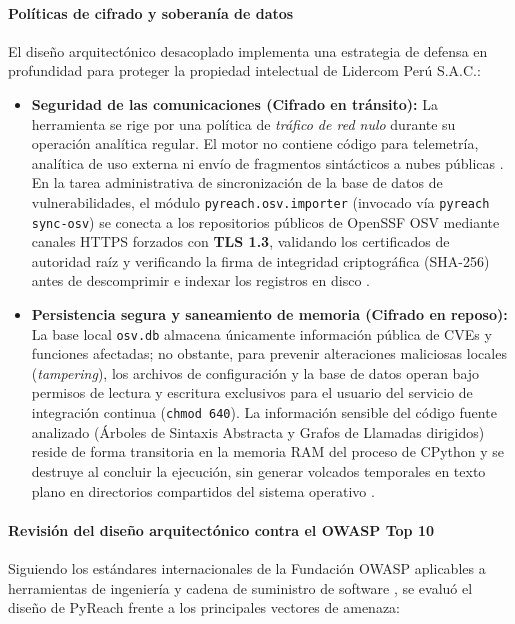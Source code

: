 \paragraph*{Políticas de cifrado y soberanía de datos}
El diseño arquitectónico desacoplado implementa una estrategia de defensa en profundidad para proteger la propiedad intelectual de Lidercom Perú S.A.C.:

\begin{itemize}
    \item \textbf{Seguridad de las comunicaciones (Cifrado en tránsito):} La herramienta se rige por una política de \textit{tráfico de red nulo} durante su operación analítica regular. El motor no contiene código para telemetría, analítica de uso externa ni envío de fragmentos sintácticos a nubes públicas \cite{ladisa2023sok}. En la tarea administrativa de sincronización de la base de datos de vulnerabilidades, el módulo \texttt{pyreach.\allowbreak osv.\allowbreak importer} (invocado vía \texttt{pyreach sync-\allowbreak osv}) se conecta a los repositorios públicos de OpenSSF OSV mediante canales HTTPS forzados con \textbf{TLS 1.3}, validando los certificados de autoridad raíz y verificando la firma de integridad criptográfica (SHA-256) antes de descomprimir e indexar los registros en disco \cite{openssf2023osv}.
    \item \textbf{Persistencia segura y saneamiento de memoria (Cifrado en reposo):} La base local \texttt{osv.\allowbreak db} almacena únicamente información pública de CVEs y funciones afectadas; no obstante, para prevenir alteraciones maliciosas locales (\textit{tampering}), los archivos de configuración y la base de datos operan bajo permisos de lectura y escritura exclusivos para el usuario del servicio de integración continua (\texttt{chmod 640}). La información sensible del código fuente analizado (Árboles de Sintaxis Abstracta y Grafos de Llamadas dirigidos) reside de forma transitoria en la memoria RAM del proceso de CPython y se destruye al concluir la ejecución, sin generar volcados temporales en texto plano en directorios compartidos del sistema operativo \cite{pressman2020software}.
\end{itemize}

\paragraph*{Revisión del diseño arquitectónico contra el OWASP Top 10}
Siguiendo los estándares internacionales de la Fundación OWASP aplicables a herramientas de ingeniería y cadena de suministro de software \cite{owasp2021top10, owasp2025top10}, se evaluó el diseño de PyReach frente a los principales vectores de amenaza:

